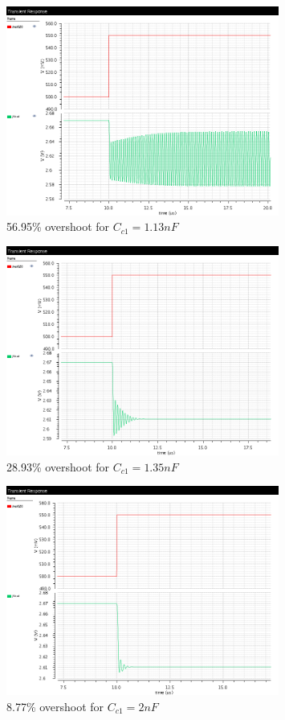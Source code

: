 \documentclass[a4paper,english,11pt]{article}
\begin{document}
\begin{figure}[H]
 \centering
  \includegraphics[width=0.8\textwidth]{img/cad_pm/pm_20_1_13nF.png}
  \caption{56.95\% overshoot for $C_{c1} = 1.13nF$}
  \label{pm20}	
\end{figure}


\begin{figure}[H]
 \centering
  \includegraphics[width=0.8\textwidth]{img/cad_pm/pm_40_1_35nF.png}
  \caption{28.93\% overshoot for $C_{c1} = 1.35nF$}
  \label{pm40}	
\end{figure}

\begin{figure}[H]
 \centering
  \includegraphics[width=0.8\textwidth]{img/cad_pm/pm_60_2nF.png}
  \caption{8.77\% overshoot for $C_{c1} = 2nF$}
  \label{pm60}	
\end{figure}
\end{document}
